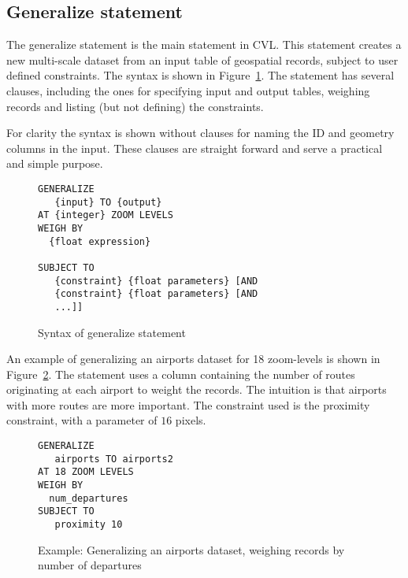 \subsection{Generalize statement}
\label{sec:generalize-statement}

The generalize statement is the main statement in CVL. This statement creates a new multi-scale dataset from an input table of geospatial records, subject to user defined constraints. The syntax is shown in Figure~\ref{fig:generalize-syntax}. The statement has several clauses, including the ones for specifying input and output tables, weighing records and listing (but not defining) the constraints. 

For clarity the syntax is shown without clauses for naming the ID and geometry columns in the input. These clauses are straight forward and serve a practical and simple purpose.

\begin{figure}[htbp]
\begin{center}
\begin{lstlisting}
GENERALIZE 
   {input} TO {output}
AT {integer} ZOOM LEVELS
WEIGH BY
  {float expression}

SUBJECT TO 
   {constraint} {float parameters} [AND
   {constraint} {float parameters} [AND
   ...]]
\end{lstlisting}
\caption{Syntax of generalize statement}
\label{fig:generalize-syntax}
\end{center}
\end{figure}

An example of generalizing an airports dataset for 18 zoom-levels is shown in Figure~\ref{fig:cvl-example-airports}. The statement uses a column containing the number of routes originating at each airport to weight the records. The intuition is that airports with more routes are more important. The constraint used is the proximity constraint, with a parameter of $16$ pixels.

\begin{figure}[htbp]
\begin{center}
\begin{lstlisting}
GENERALIZE 
   airports TO airports2
AT 18 ZOOM LEVELS
WEIGH BY
  num_departures
SUBJECT TO 
   proximity 10 
\end{lstlisting}
\caption{Example: Generalizing an airports dataset, weighing records by number of departures}
\label{fig:cvl-example-airports}
\end{center}
\end{figure}


